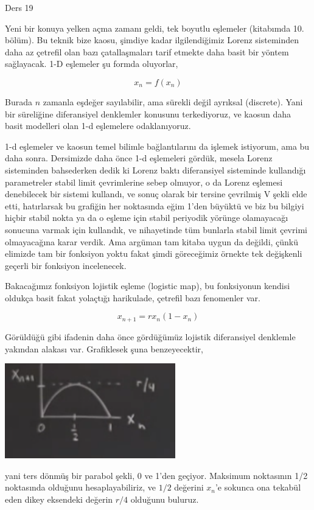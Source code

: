 \documentclass[12pt,fleqn]{article}\usepackage{../../common}
\begin{document}
Ders 19

Yeni bir konuya yelken açma zamanı geldi, tek boyutlu eşlemeler (kitabımda
10. bölüm). Bu teknik bize kaosu, şimdiye kadar ilgilendiğimiz Lorenz
sisteminden daha az çetrefil olan bazı çatallaşmaları tarif etmekte daha
basit bir yöntem sağlayacak. 1-D eşlemeler şu formda oluyorlar,

$$ x_n = f(x_n) $$

Burada $n$ zamanla eşdeğer sayılabilir, ama sürekli değil ayrıksal
(discrete). Yani bir süreliğine diferansiyel denklemler konusunu
terkediyoruz, ve kaosun daha basit modelleri olan 1-d eşlemelere
odaklanıyoruz. 

1-d eşlemeler ve kaosun temel bilimle bağlantılarını da işlemek istiyorum,
ama bu daha sonra. Dersimizde daha önce 1-d eşlemeleri gördük, mesela
Lorenz sisteminden bahsederken dedik ki Lorenz baktı diferansiyel
sisteminde kullandığı parametreler stabil limit çevrimlerine sebep olmuyor,
o da Lorenz eşlemesi denebilecek bir sistemi kullandı, ve sonuç olarak bir
tersine çevrilmiş V şekli elde etti, hatırlarsak bu grafiğin her noktasında
eğim 1'den büyüktü ve biz bu bilgiyi hiçbir stabil nokta ya da o eşleme
için stabil periyodik yörünge olamayacağı sonucuna varmak için kullandık,
ve nihayetinde tüm bunlarla stabil limit çevrimi olmayacağına karar
verdik. Ama argüman tam kitaba uygun da değildi, çünkü elimizde tam bir
fonksiyon yoktu fakat şimdi göreceğimiz örnekte tek değişkenli geçerli bir
fonksiyon incelenecek.

Bakacağımız fonksiyon lojistik eşleme (logistic map), bu fonksiyonun
kendisi oldukça basit fakat yolaçtığı harikulade, çetrefil bazı fenomenler
var.

$$ x_{n+1} = r x_n (1-x_n) $$

Görüldüğü gibi ifadenin daha önce gördüğümüz lojistik diferansiyel
denklemle yakından alakası var. Grafiklesek şuna benzeyecektir,

\includegraphics[width=20em]{19_01.png}

yani ters dönmüş bir parabol şekli, 0 ve 1'den geçiyor. Maksimum noktasının
1/2 noktasında olduğunu hesaplayabiliriz, ve $1/2$ değerini $x_n$'e sokunca
ona tekabül eden dikey eksendeki değerin $r/4$ olduğunu buluruz. 
\end{document}
